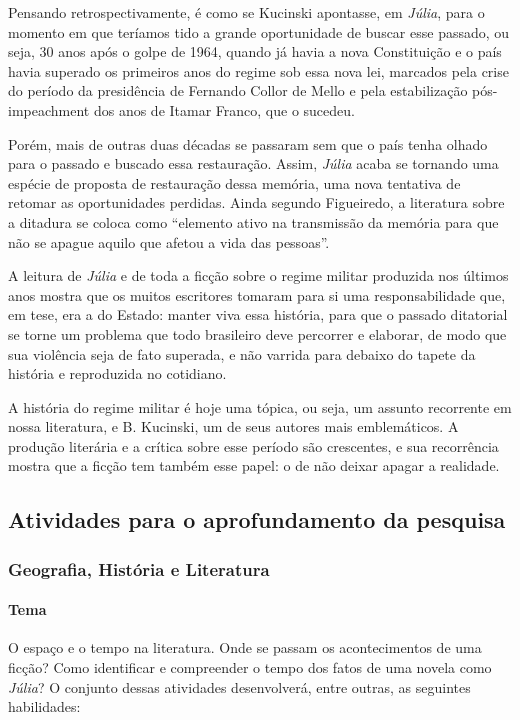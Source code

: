 \documentclass[12pt]{extarticle}
\begin{document}
Pensando retrospectivamente, é como se Kucinski apontasse, em  \emph{Júlia}, para o
momento em que teríamos tido a grande oportunidade de buscar esse
passado, ou seja, 30 anos após o golpe de 1964, quando já havia a nova
Constituição e o país havia superado os primeiros anos do regime sob
essa nova lei, marcados pela crise do período da presidência de Fernando
Collor de Mello e pela estabilização pós-impeachment dos anos de Itamar
Franco, que o sucedeu.

Porém, mais de outras duas décadas se passaram sem que o país tenha olhado
para o passado e buscado essa restauração. Assim, \emph{Júlia} acaba se
tornando uma espécie de proposta de restauração dessa memória, uma nova
tentativa de retomar as oportunidades perdidas. Ainda segundo
Figueiredo, a literatura sobre a ditadura se coloca como ``elemento
ativo na transmissão da memória para que não se apague aquilo que afetou
a vida das pessoas''.

A leitura de \emph{Júlia} e de toda a ficção sobre o regime militar
produzida nos últimos anos mostra que os muitos escritores tomaram para
si uma responsabilidade que, em tese, era a do Estado: manter viva essa
história, para que o passado ditatorial se torne um problema que todo
brasileiro deve percorrer e elaborar, de modo que sua violência seja de
fato superada, e não varrida para debaixo do tapete da história e
reproduzida no cotidiano.

A história do regime militar é hoje uma tópica, ou seja, um assunto
recorrente em nossa literatura, e B. Kucinski, um de seus autores mais
emblemáticos. A produção literária e a crítica sobre esse período são
crescentes, e sua recorrência mostra que a ficção tem também esse papel:
o de não deixar apagar a realidade.


\subsection{Atividades para o aprofundamento da pesquisa}

\subsubsection{Geografia, História e Literatura}

\paragraph{Tema} O espaço e o tempo na literatura. Onde se passam os
acontecimentos de uma ficção? Como identificar e compreender o tempo dos
fatos de uma novela como \emph{Júlia}? O conjunto dessas atividades desenvolverá, entre outras, as seguintes habilidades:
\end{document}
